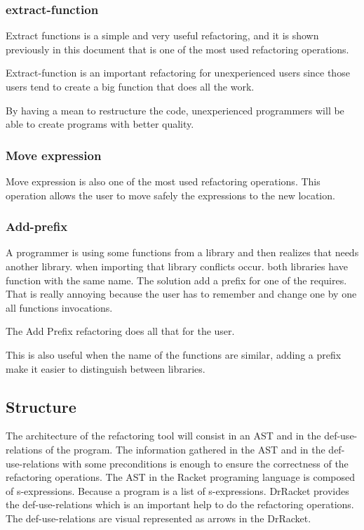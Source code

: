 \subsubsection{extract-function}

Extract functions is a simple and very useful refactoring, and it is shown previously in this document that is one of the most used refactoring operations.

Extract-function is an important refactoring for unexperienced users since those users tend to create a big function that does all the work.

By having a mean to restructure the code, unexperienced programmers will be able to create programs with better quality.




\subsubsection{Move expression}

Move expression is also one of the most used refactoring operations.
This operation allows the user to move safely the expressions to the new location.



\subsubsection{Add-prefix}
A programmer is using some functions from a library and then realizes that needs another library. when importing that library conflicts occur.
both libraries have function with the same name. The solution add a prefix for one of the requires.
That is really annoying because the user has to remember and change one by one all functions invocations.

The Add Prefix refactoring does all that for the user.

This is also useful when the name of the functions are similar, adding a prefix make it easier to distinguish between libraries.





\subsection{Structure}

The architecture of the refactoring tool will consist in an AST and in the def-use-relations of the program.
The information gathered in the AST and in the def-use-relations with some preconditions is enough to ensure the correctness of the refactoring operations.
The AST in the Racket programing language is composed of s-expressions. Because a program is a list of s-expressions.
DrRacket provides the def-use-relations which is an important help to do the refactoring operations. The def-use-relations are visual represented as arrows in the DrRacket.



